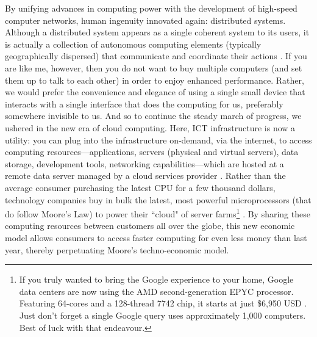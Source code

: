 \documentclass{article}
\begin{document}
By unifying advances in computing power with the development of high-speed computer networks, human ingenuity innovated again: distributed systems. Although a distributed system appears as a single coherent system to its users, it is actually a collection of autonomous computing elements (typically geographically dispersed) that communicate and coordinate their actions \cite{van2017distributed}. If you are like me, however, then you do not want to buy multiple computers (and set them up to talk to each other) in order to enjoy enhanced performance. Rather, we would prefer the convenience and elegance of using a single small device that interacts with a single interface that does the computing for us, preferably somewhere invisible to us. And so to continue the steady march of progress, we ushered in the new era of cloud computing. Here, ICT infrastructure is now a utility: you can plug into the infrastructure on-demand, via the internet, to access computing resources—applications, servers (physical and virtual servers), data storage, development tools, networking capabilities—which are hosted at a remote data server managed by a cloud services provider \cite{ibm2020cloudcomputing}. Rather than the average consumer purchasing the latest CPU for a few thousand dollars, technology companies buy in bulk the latest, most powerful microprocessors (that do follow Moore's Law) to power their ``cloud" of server farms\footnote{If you truly wanted to bring the Google experience to your home, Google data centers are now using the AMD second-generation EPYC processor. Featuring 64-cores and a 128-thread 7742 chip, it starts at just \$6,950 USD \cite{techcrunch2019EPYCprocessor}. Just don't forget a single Google query uses approximately 1,000 computers. Best of luck with that endeavour.} \cite{waldrop2016chips}. By sharing these computing resources between customers all over the globe, this new economic model allows consumers to access faster computing for even less money than last year, thereby perpetuating Moore's techno-economic model.


\end{document}
